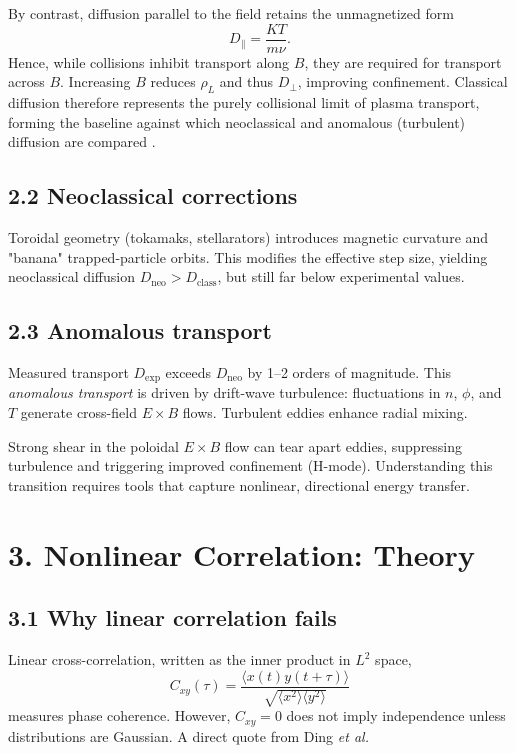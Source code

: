 \documentclass[11pt]{article}
\begin{document}
By contrast, diffusion parallel to the field retains the unmagnetized form
\[
D_\parallel = \frac{K T}{m \nu}.
\]
Hence, while collisions inhibit transport along $B$, they are required for transport across $B$.  
Increasing $B$ reduces $\rho_L$ and thus $D_\perp$, improving confinement.  
Classical diffusion therefore represents the purely collisional limit of plasma transport, forming the baseline against which neoclassical and anomalous (turbulent) diffusion are compared \cite{chenIntroductionPlasmaPhysics2016}.

\subsection*{2.2 Neoclassical corrections}

Toroidal geometry (tokamaks, stellarators) introduces magnetic curvature and "banana" trapped-particle orbits. This modifies the effective step size, yielding neoclassical diffusion $D_{\text{neo}} > D_{\text{class}}$, but still far below experimental values.

\subsection*{2.3 Anomalous transport}

Measured transport $D_{\text{exp}}$ exceeds $D_{\text{neo}}$ by 1–2 orders of magnitude. This \emph{anomalous transport} is driven by drift-wave turbulence: fluctuations in $n$, $\phi$, and $T$ generate cross-field $E\times B$ flows. Turbulent eddies enhance radial mixing. 

Strong shear in the poloidal $E\times B$ flow can tear apart eddies, suppressing turbulence and triggering improved confinement (H-mode). Understanding this transition requires tools that capture nonlinear, directional energy transfer.

\section*{3. Nonlinear Correlation: Theory}

\subsection*{3.1 Why linear correlation fails}

Linear cross-correlation, written as the inner product in $L^2$ space, 
\[
C_{xy}(\tau)=\frac{\langle x(t)y(t+\tau)\rangle}{\sqrt{\langle x^2\rangle\langle y^2\rangle}}
\]
measures phase coherence. However, $C_{xy}=0$ does not imply independence unless distributions are Gaussian. A direct quote from Ding \textit{et al.} 
\end{document}
